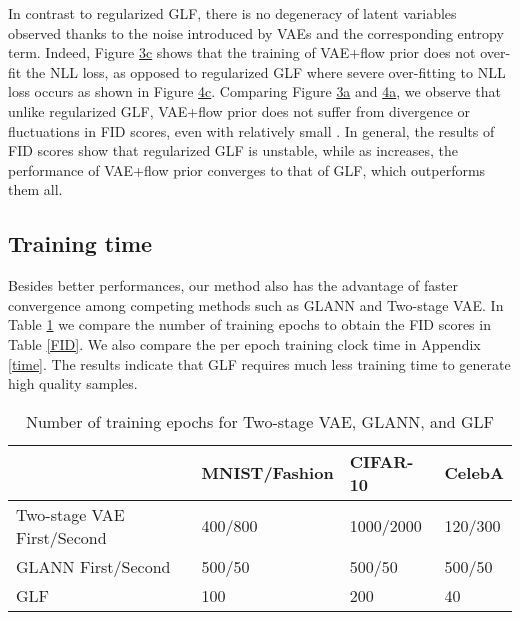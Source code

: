 \documentclass{article}
\begin{document}
In contrast to regularized GLF, there is no degeneracy of latent variables observed thanks to the noise introduced by VAEs and the corresponding entropy term. Indeed, Figure \hyperref[fig:4]{3c} shows that the training of VAE+flow prior does not over-fit the NLL loss, as opposed to regularized GLF where severe over-fitting to NLL loss occurs as shown in Figure \hyperref[fig:cifar glf]{4c}. Comparing Figure \hyperref[fig:4]{3a} and \hyperref[fig:cifar glf]{4a}, we observe that unlike regularized GLF, VAE+flow prior does not suffer from divergence or fluctuations in FID scores, even with relatively small . In general, the results of FID scores show that regularized GLF is unstable, while as  increases, the performance of VAE+flow prior converges to that of GLF, which outperforms them all. 


\subsection{Training time}\label{training}
Besides better performances, our method also has the advantage of faster convergence among competing methods such as GLANN and Two-stage VAE. In Table \ref{epoch} we compare the number of training epochs to obtain the FID scores in Table \ref{FID}. We also compare the per epoch training clock time in Appendix \ref{time}. The results indicate that GLF requires much less training time to generate high quality samples. 

\begin{table}
  \caption{Number of training epochs for Two-stage VAE, GLANN, and GLF}
  \label{epoch}
  \centering
  \begin{tabular}{llll}
    \toprule
        & MNIST/Fashion   & CIFAR-10 & CelebA \\
    \midrule
	 Two-stage VAE First/Second & 400/800 & 1000/2000 &  120/300 \\
	 GLANN First/Second & 500/50  & 500/50 & 500/50 \\
	 GLF & 100 & 200 &  40  \\
    \bottomrule
  \end{tabular}
\end{table}
\end{document}
